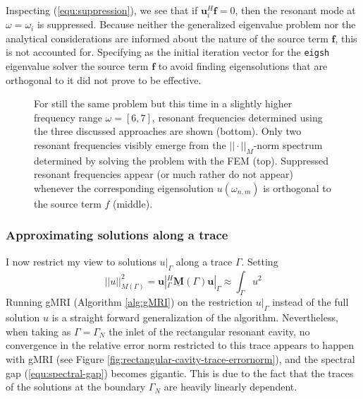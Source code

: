 \documentclass[11pt, a4paper]{article}
\begin{document}
Inspecting (\ref{equ:suppression}), we see that if $\mathbf{u}_i^H \mathbf{f} = 0$,
then the resonant mode at $\omega = \omega_i$ is suppressed. Because neither the
generalized eigenvalue problem nor the analytical considerations
are informed about the nature of the source term $\mathbf{f}$, this is not accounted for.
Specifying as the initial iteration vector for the \texttt{eigsh} eigenvalue solver
the source term $\mathbf{f}$ to avoid finding eigensolutions that are orthogonal
to it did not prove to be effective.

\begin{figure}[ht]
    \centering
    
    \caption{For still the same problem but this time in a slightly higher
    frequency range $\omega = [6, 7]$, resonant frequencies determined using the
    three discussed approaches are shown (bottom). Only two resonant
    frequencies visibly emerge from the $||\cdot||_M$-norm spectrum determined by
    solving the problem with the \acrshort{FEM} (top). Suppressed resonant
    frequencies appear (or much rather do not appear) whenever the corresponding
    eigensolution $u(\omega_{n, m})$ is orthogonal to the source term $f$ (middle).}
    \label{fig:rectangular-cavity-suppression}
\end{figure}

\subsubsection{Approximating solutions along a trace}
\label{subsubsec:traces}

I now restrict my view to solutions $u|_{\Gamma}$ along a trace $\Gamma$. Setting
\begin{equation}
    ||u||_{M(\Gamma)}^2 = \mathbf{u}|_{\Gamma}^H \mathbf{\underline{M}}(\Gamma) \mathbf{u}|_{\Gamma}
        \approx \int_{\Gamma} u^2
\end{equation}
Running \acrshort{gMRI} (Algorithm \ref{alg:gMRI}) on the restriction $u|_{\Gamma}$
instead of the full solution $u$ is a straight forward generalization of the
algorithm. Nevertheless, when taking as $\Gamma = \Gamma_N$ the inlet of the
rectangular resonant cavity, no convergence in the relative error norm restricted
to this trace appears to happen with \acrshort{gMRI} (see Figure \ref{fig:rectangular-cavity-trace-errornorm}),
and the spectral gap (\ref{equ:spectral-gap}) becomes gigantic.
This is due to the fact that the traces of the solutions at the boundary $\Gamma_N$
are heavily linearly dependent.
\end{document}
